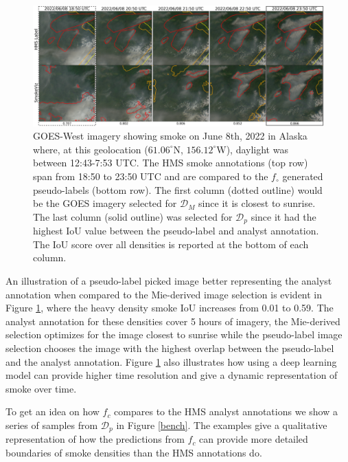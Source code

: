 \documentclass{article}
\begin{document}
\begin{figure}
    \centering
    \includegraphics[width=\linewidth]{figures/final_results_small.png}
    \caption{GOES-West imagery showing smoke on June 8th, 2022 in Alaska where, at this geolocation (\(61.06^{\circ}\)N, \(156.12^{\circ}\)W), daylight was between 12:43-7:53 UTC. The HMS smoke annotations (top row) span from 18:50 to 23:50 UTC and are compared to the \(f_{\circ}\) generated pseudo-labels (bottom row). The first column (dotted outline) would be the GOES imagery selected for \(\mathcal{D}_{M}\) since it is closest to sunrise. The last column (solid outline) was selected for \(\mathcal{D}_{p}\) since it had the highest IoU value between the pseudo-label and analyst annotation. The IoU score over all densities is reported at the bottom of each column.}
    \label{ml_vs_mei}
\end{figure}

An illustration of a pseudo-label picked image better representing the analyst annotation when compared to the Mie-derived image selection is evident in Figure \ref{ml_vs_mei}, where the heavy density smoke IoU increases from 0.01 to 0.59. The analyst annotation for these densities cover 5 hours of imagery, the Mie-derived selection optimizes for the image closest to sunrise while the pseudo-label image selection chooses the image with the highest overlap between the pseudo-label and the analyst annotation. Figure \ref{ml_vs_mei} also illustrates how using a deep learning model can provide higher time resolution and give a dynamic representation of smoke over time.

To get an idea on how \(f_{c}\) compares to the HMS analyst annotations we show a series of samples from \(\mathcal{D}_{p}\) in Figure \ref{bench}. The examples give a qualitative representation of how the predictions from \(f_c\) can provide more detailed boundaries of smoke densities than the HMS annotations do.
\end{document}
